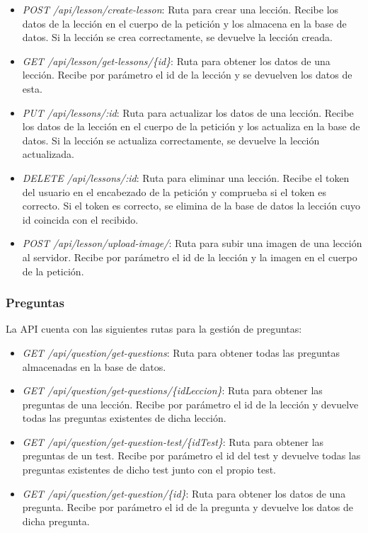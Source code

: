 \begin{itemize}
    \item \textit{POST /api/lesson/create-lesson}: Ruta para crear una lección. Recibe los datos de la lección en el cuerpo de la petición y los almacena en la base de datos. Si la lección se crea correctamente, se devuelve la lección creada.
    \item \textit{GET /api/lesson/get-lessons/\{id\}}: Ruta para obtener los datos de una lección. Recibe por parámetro el id de la lección y se devuelven los datos de esta.
    \item \textit{PUT /api/lessons/:id}: Ruta para actualizar los datos de una lección. Recibe los datos de la lección en el cuerpo de la petición y los actualiza en la base de datos. Si la lección se actualiza correctamente, se devuelve la lección actualizada.
    \item \textit{DELETE /api/lessons/:id}: Ruta para eliminar una lección. Recibe el token del usuario en el encabezado de la petición y comprueba si el token es correcto. Si el token es correcto, se elimina de la base de datos la lección cuyo id coincida con el recibido.
    \item \textit{POST /api/lesson/upload-image/}: Ruta para subir una imagen de una lección al servidor. Recibe por parámetro el id de la lección y la imagen en el cuerpo de la petición.
\end{itemize}

\subsubsection{Preguntas}
\label{sec:preguntas}
La API cuenta con las siguientes rutas para la gestión de preguntas:

\begin{itemize}
  \item \textit{GET /api/question/get-questions}: Ruta para obtener todas las preguntas almacenadas en la base de datos.
  \item \textit{GET /api/question/get-questions/\{idLeccion\}}: Ruta para obtener las preguntas de una lección. Recibe por parámetro el id de la lección y devuelve todas las preguntas existentes de dicha lección.
  \item \textit{GET /api/question/get-question-test/\{idTest\}}: Ruta para obtener las preguntas de un test. Recibe por parámetro el id del test y devuelve todas las preguntas existentes de dicho test junto con el propio test.
  \item \textit{GET /api/question/get-question/\{id\}}: Ruta para obtener los datos de una pregunta. Recibe por parámetro el id de la pregunta y devuelve los datos de dicha pregunta.
\end{itemize}


